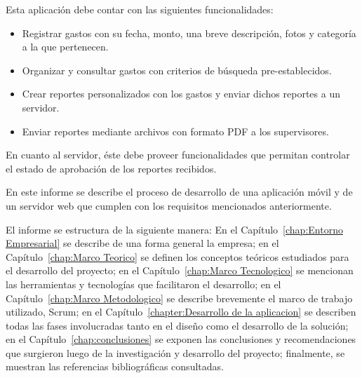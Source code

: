 

Esta aplicación debe contar con las siguientes funcionalidades:

\begin{itemize}
\item Registrar gastos con su fecha, monto, una breve descripción, fotos y categoría a la que pertenecen.
\item Organizar y consultar gastos con criterios de búsqueda pre-establecidos.
\item Crear reportes personalizados con los gastos y enviar dichos reportes a un servidor.
\item Enviar reportes mediante archivos con formato PDF a los supervisores.
\end{itemize}

En cuanto al servidor, éste debe proveer funcionalidades que permitan controlar el estado de aprobación de los reportes recibidos.

En este informe se describe el proceso de desarrollo de una aplicación móvil y de un servidor web que cumplen con los requisitos mencionados anteriormente.

El informe se estructura de la siguiente manera: En el Capítulo~\ref{chap:Entorno Empresarial} se describe de una forma general la empresa; en el Capítulo~\ref{chap:Marco Teorico} se definen los conceptos teóricos estudiados para el desarrollo del proyecto; en el Capítulo~\ref{chap:Marco Tecnologico} se mencionan las herramientas y tecnologías que facilitaron el desarrollo; en el Capítulo~\ref{chap:Marco Metodologico} se describe brevemente el marco de trabajo utilizado, Scrum; en el Capítulo~\ref{chapter:Desarrollo de la aplicacion} se describen todas las fases involucradas tanto en el diseño como el desarrollo de la solución; en el Capítulo~\ref{chap:conclusiones} se exponen las conclusiones y recomendaciones que surgieron luego de la investigación y desarrollo del proyecto; finalmente, se muestran las referencias bibliográficas consultadas.